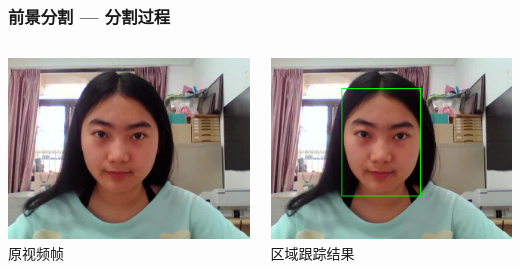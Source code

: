 \documentclass[xcolor=svgnames,serif,table,10pt]{beamer}
\begin{document}
\begin{frame}
  \frametitle{前景分割 --- 分割过程}
  \scriptsize
  \centering
  \begin{columns}
    \raggedleft
    \begin{minipage}{.7\linewidth}
      \centering
      \includegraphics[width=\textwidth]{grabcut-original.png}\\
      原视频帧
    \end{minipage}
    \begin{minipage}{0.7\linewidth}
      \centering
      \includegraphics[width=\textwidth]{grabcut-track.png}\\
      区域跟踪结果
    \end{minipage}
  \end{columns}


\end{frame}
\end{document}
